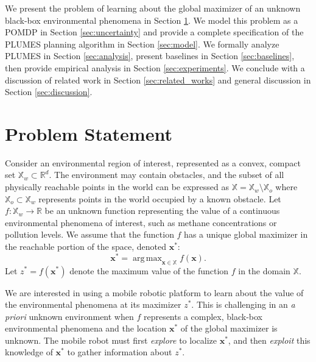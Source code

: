 \documentclass{styles/svproc}
\DeclareMathOperator*{\argmax}{arg\,max} %
\newcommand{\x}{\mathbf{x}}
\begin{document}
We present the problem of learning about the global maximizer of an unknown black-box environmental phenomena in Section \ref{prob}. We model this problem as a POMDP in Section \ref{sec:uncertainty} and provide a complete specification of the PLUMES planning algorithm in Section \ref{sec:model}. We formally analyze PLUMES in Section \ref{sec:analysis}, present baselines in Section \ref{sec:baselines}, then provide empirical analysis in Section \ref{sec:experiments}. We conclude with a discussion of related work in Section \ref{sec:related_works} and general discussion in Section \ref{sec:discussion}.


\section{Problem Statement}
\label{prob}

Consider an environmental region of interest, represented as a convex, compact set $\mathbb{X}_w \subset \mathbb{R}^d$. The environment may contain obstacles, and the subset of all physically reachable points in the world can be expressed as $\mathbb{X} = \mathbb{X}_w \setminus \mathbb{X}_o$ where $\mathbb{X}_o \subset \mathbb{X}_w$ represents points in the world occupied by a known obstacle. Let $f: \mathbb{X}_w \to \mathbb{R}$ be an unknown function representing the value of a continuous environmental phenomena of interest, such as methane concentrations or pollution levels. We assume that the function $f$ has a unique global maximizer in the reachable portion of the space, denoted $\x^*$:
\begin{equation}
\x^* = \argmax_{\x \in \mathbb{X}} f(\x).
\end{equation}
Let $z^* = f(\x^*)$ denote the maximum value of the function $f$ in the domain $\mathbb{X}$.

We are interested in using a mobile robotic platform to learn about the value of the environmental phenomena at its maximizer $z^*$. This is challenging in an \textit{a priori} unknown environment when $f$ represents a complex, black-box environmental phenomena and the location $\x^*$ of the global maximizer is unknown. The mobile robot must first \textit{explore} to localize $\x^*$, and then \textit{exploit} this knowledge of $\x^*$ to gather information about $z^*$. 
\end{document}
